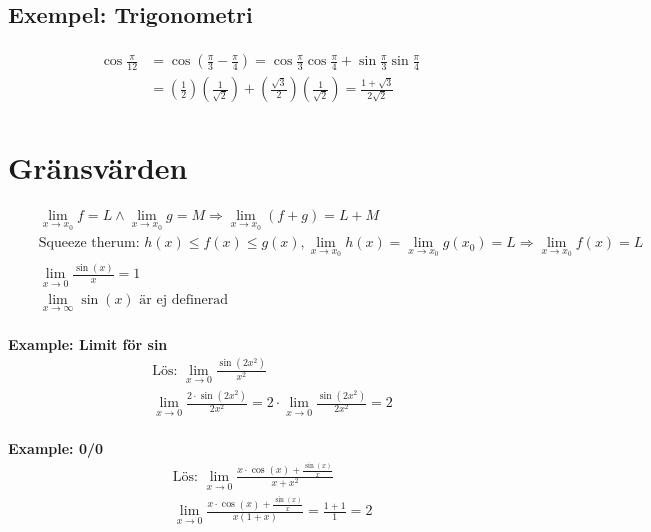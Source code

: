 \subsection{Exempel: Trigonometri}
\begin{align*}
  \begin{aligned} \cos \frac { \pi } { 12 } & = \cos \left( \frac { \pi } { 3 } - \frac { \pi } { 4 } \right) = \cos \frac { \pi } { 3 } \cos \frac { \pi } { 4 } + \sin \frac { \pi } { 3 } \sin \frac { \pi } { 4 } \\ & = \left( \frac { 1 } { 2 } \right) \left( \frac { 1 } { \sqrt { 2 } } \right) + \left( \frac { \sqrt { 3 } } { 2 } \right) \left( \frac { 1 } { \sqrt { 2 } } \right) = \frac { 1 + \sqrt { 3 } } { 2 \sqrt { 2 } } \end{aligned}
\end{align*}


\newpage


\section{Gränsvärden}
\begin{align*}
  &\quad  \lim_{x\to x_0} f = L \land \lim_{x\to x_0} g = M \Rightarrow \lim_{x\to x_0}(f+g) = L+M  \\
  &\quad  \text{Squeeze therum: } h(x) \leq f(x) \leq g(x), \lim_{x\to x_0} h(x) = \lim_{x\to x_0} g(x_0) = L
  \Rightarrow \lim_{x\to x_0} f(x) = L \\
  &\quad  \lim_{x\to 0} \frac{\sin(x)}{x}=1  \\
  &\quad  \lim_{x\to\infty} \sin(x) \text{ är ej definerad}  \\
\end{align*}


\textbf{Example: Limit för sin}
\begin{align*}
  &\quad  \text{Lös: } \lim_{x\to 0} \frac{\sin(2x^2)}{x^2}  \\
  &\quad  \lim_{x\to 0} \frac{2 \cdot \sin(2x^2)}{2x^2} = 2 \cdot \lim_{x\to 0} \frac{\sin(2x^2)}{2x^2} = 2 \\
\end{align*}

\textbf{Example: 0/0}
\begin{align*}
  &\quad  \text{Lös: } \lim_{x\to 0} \frac{x \cdot \cos(x) + \frac{\sin(x)}{x}}{x+x^2}  \\
  &\quad  \lim_{x\to 0} \frac{x \cdot \cos(x) + \frac{\sin(x)}{x}}{x(1+x)} = \frac{1+1}{1} = 2  \\
\end{align*}

